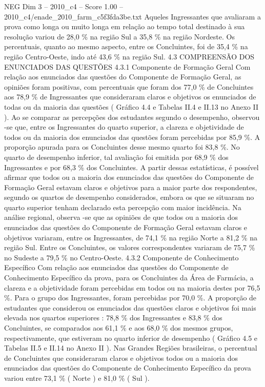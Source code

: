 \begin{textsample}{NEG Dim 3 – 2010\_c4 – Score 1.00 – 2010\_c4/enade\_2010\_farm\_c5f3fda3be.txt}
Aqueles Ingressantes que avaliaram a prova como longa ou muito longa em relação ao tempo total destinado à sua resolução variou de 28,0 \% na região Sul a 35,8 \% na região Nordeste.
Os percentuais, quanto ao mesmo aspecto, entre os Concluintes, foi de 35,4 \% na região Centro-Oeste, indo até 43,6 \% na região Sul. 4.3 COMPREENSÃO DOS ENUNCIADOS DAS QUESTÕES 4.3.1 Componente de Formação Geral Com relação aos enunciados das questões do Componente de Formação Geral, as opiniões foram positivas, com percentuais que foram dos 77,0 \% de Concluintes aos 78,9 \% de Ingressantes que consideraram claros e objetivos os enunciados de todas ou da maioria das questões ( Gráfico 4.4 e Tabelas II.4 e II.13 no Anexo II ).
Ao se comparar as percepções dos estudantes segundo o desempenho, observou -se que, entre os Ingressantes do quarto superior, a clareza e objetividade de todos ou da maioria dos enunciados das questões foram percebidas por 85,9 \%.
A proporção apurada para os Concluintes desse mesmo quarto foi 83,8 \%.
No quarto de desempenho inferior, tal avaliação foi emitida por 68,9 \% dos Ingressantes e por 68,3 \% dos Concluintes.
A partir dessas estatísticas, é possível afirmar que todos ou a maioria dos enunciados das questões do Componente de Formação Geral estavam claros e objetivos para a maior parte dos respondentes, segundo os quartos de desempenho considerados, embora os que se situaram no quarto superior tenham declarado esta percepção com maior incidência.
Na análise regional, observa -se que as opiniões de que todos ou a maioria dos enunciados das questões do Componente de Formação Geral estavam claros e objetivos variaram, entre os Ingressantes, de 74,1 \% na região Norte a 81,2 \% na região Sul.
Entre os Concluintes, os valores correspondentes variaram de 75,7 \% no Sudeste a 79,5 \% no Centro-Oeste. 4.3.2 Componente de Conhecimento Específico Com relação aos enunciados das questões do Componente de Conhecimento Específico da prova, para os Concluintes da Área de Farmácia, a clareza e a objetividade foram percebidas em todos ou na maioria destes por 76,5 \%.
Para o grupo dos Ingressantes, foram percebidas por 70,0 \%.
A proporção de estudantes que considerou os enunciados das questões claros e objetivos foi mais elevada nos quartos superiores : 78,8 \% dos Ingressantes e 83,8 \% dos Concluintes, se comparados aos 61,1 \% e aos 68,0 \% dos mesmos grupos, respectivamente, que estiveram no quarto inferior de desempenho ( Gráfico 4.5 e Tabelas II.5 e II.14 no Anexo II ).
Nas Grandes Regiões brasileiras, o percentual de Concluintes que consideraram claros e objetivos todos ou a maioria dos enunciados das questões do Componente de Conhecimento Específico da prova variou entre 73,1 \% ( Norte ) e 81,0 \% ( Sul ).

\end{textsample}
